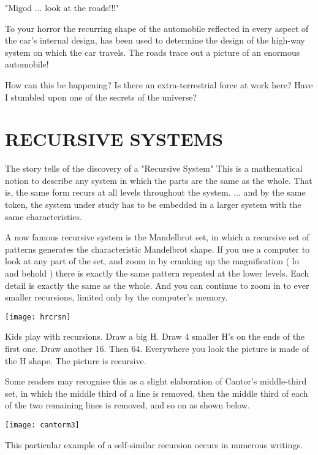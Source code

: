 "Migod ... look at the roads!!!"

To your horror the recurring shape of the automobile reflected in every aspect of the car's internal design, has been used to determine the design of the high-way system on which the car travels. The roads trace out a picture of an enormous automobile!

How can this be happening? Is there an extra-terrestrial force at work here? Have I stumbled upon one of the secrets of the universe?

\section*{RECURSIVE SYSTEMS}
The story tells of the discovery of a "Recursive System" This is a mathematical notion to describe any system in which the parts are the same as the whole. That is, the same form recurs at all levels throughout the system. ... and by the same token, the system under study has to be embedded in a larger system with the same characteristics.

A now famous recursive system is the Mandelbrot set, in which a recursive set of patterns generates the characteristic Mandelbrot shape. If you use a computer to look at any part of the set, and zoom in by cranking up the magnification ( lo and behold ) there is exactly the same pattern repeated at the lower levels. Each detail is exactly the same as the whole. And you can continue to zoom in to ever smaller recursions, limited only by the computer's memory.

\begin{center}
\texttt{[image: hrcrsn]}
\end{center}

Kids play with recursions. Draw a big H. Draw 4 smaller H's on the ends of the first one. Draw another 16. Then 64. Everywhere you look the picture is made of the H shape. The picture is recursive.

Some readers may recognise this as a slight elaboration of Cantor's middle-third set, in which the middle third of a line is removed, then the middle third of each of the two remaining lines is removed, and so on as shown below.

\begin{center}
\texttt{[image: cantorm3]}
\end{center}

This particular example of a self-similar recursion occurs in numerous writings.

